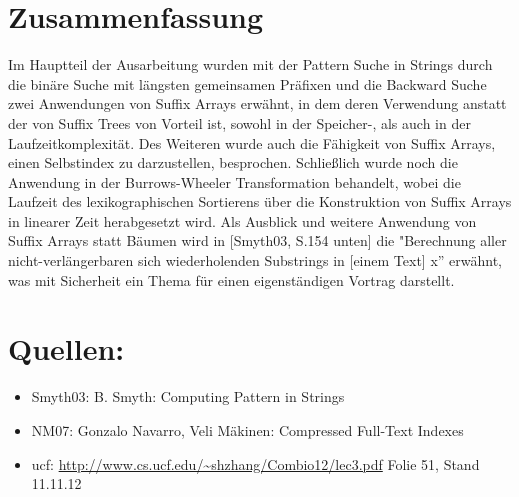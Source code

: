 \documentclass[12pt,twoside]{article}
\begin{document}
\section{Zusammenfassung}
Im Hauptteil der Ausarbeitung wurden mit der Pattern Suche in Strings durch die binäre Suche mit längsten gemeinsamen Präfixen und die Backward Suche zwei Anwendungen von Suffix Arrays erwähnt, in dem deren Verwendung anstatt der von Suffix Trees von Vorteil ist, sowohl in der Speicher-, als auch in der Laufzeitkomplexität. Des Weiteren wurde auch die Fähigkeit von Suffix Arrays, einen Selbstindex zu darzustellen, besprochen. Schließlich wurde noch die Anwendung in der Burrows-Wheeler Transformation behandelt, wobei die Laufzeit des lexikographischen Sortierens über die Konstruktion von Suffix Arrays in linearer Zeit herabgesetzt wird. Als Ausblick und weitere Anwendung von Suffix Arrays statt Bäumen wird in [Smyth03, S.154 unten] die "Berechnung aller nicht-verlängerbaren sich wiederholenden Substrings in [einem Text] x'' erwähnt, was mit Sicherheit ein Thema für einen eigenständigen Vortrag darstellt.

\section{Quellen:}
\begin{itemize}
\item Smyth03: B. Smyth: Computing Pattern in Strings
\item NM07: Gonzalo Navarro, Veli Mäkinen: Compressed Full-Text Indexes
\item ucf: \url{http://www.cs.ucf.edu/~shzhang/Combio12/lec3.pdf} Folie 51, Stand 11.11.12
\end{itemize}
\end{document}
